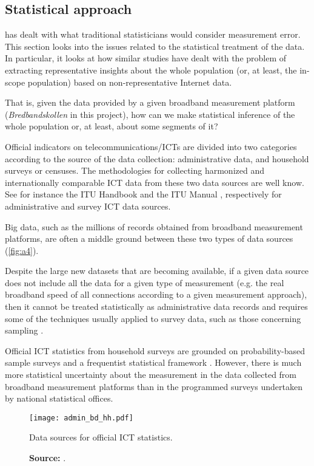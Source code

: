 \documentclass[12pt]{article}
\begin{document}
\subsection{Statistical approach} \label{stats}

 has dealt with what traditional statisticians would consider measurement error. This section looks into the issues related to the statistical treatment of the data. In particular, it looks at how similar studies have dealt with the problem of extracting representative insights about the whole population (or, at least, the in-scope population) 
based on non-representative Internet data. 

That is, given the data provided by a given broadband measurement platform (\textit{Bredbandskollen} in this project), how can we make statistical inference of the whole population or, at least, about some segments of it? 

Official indicators on telecommunications/ICTs are divided into two categories according to the source of the data collection: administrative data, and household surveys or censuses. The methodologies for collecting harmonized and internationally comparable ICT data from these two data sources are well know. See for instance the ITU Handbook \citep{handbook} and the ITU Manual \citep{manual}, respectively for administrative and survey ICT data sources.   

Big data, such as the millions of records obtained from broadband measurement platforms, are often a middle ground between these two types of data sources (\autoref{fig:a4}). 

Despite the large new datasets that are becoming available, if a given data source does not include all the data for a given type of measurement (e.g. the real broadband speed of all connections according to a given measurement approach), then it cannot be treated statistically as administrative data records and requires some of the techniques usually applied to survey data, such as those concerning sampling \citep{bigdata}.

Official ICT statistics from household surveys are grounded on probability-based sample surveys and a frequentist statistical framework \citep{couper2013}. However, there is much more statistical uncertainty about the measurement in the data collected from broadband measurement platforms than in the programmed surveys undertaken by national statistical offices. 

\begin{figure}[H]
    \centering
        \texttt{[image: admin\_bd\_hh.pdf]}
        \caption{Data sources for official ICT statistics.}
        \caption*{\textbf{Source:} \cite{margus}.}
        \label{fig:a4}
\end{figure}   
\end{document}
